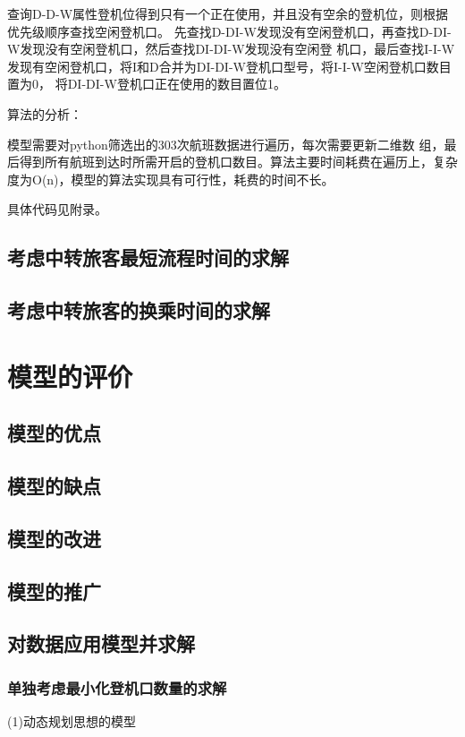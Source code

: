 \documentclass[bwprint]{gmcmthesis}
\begin{document}
查询D-D-W属性登机位得到只有一个正在使用，并且没有空余的登机位，则根据优先级顺序查找空闲登机口。
先查找D-DI-W发现没有空闲登机口，再查找D-DI-W发现没有空闲登机口，然后查找DI-DI-W发现没有空闲登
机口，最后查找I-I-W发现有空闲登机口，将I和D合并为DI-DI-W登机口型号，将I-I-W空闲登机口数目置为0，
将DI-DI-W登机口正在使用的数目置位1。


算法的分析：


模型需要对python筛选出的303次航班数据进行遍历，每次需要更新二维数
组，最后得到所有航班到达时所需开启的登机口数目。算法主要时间耗费在遍历上，复杂度为O(n)，模型的算法实现具有可行性，耗费的时间不长。


具体代码见附录。


\subsection{考虑中转旅客最短流程时间的求解}
\subsection{考虑中转旅客的换乘时间的求解}
\section{模型的评价}
\subsection{模型的优点}

\subsection{模型的缺点}
\subsection{模型的改进}
\subsection{模型的推广}




\subsection{对数据应用模型并求解}
\subsubsection{单独考虑最小化登机口数量的求解}
(1)动态规划思想的模型
\end{document}
